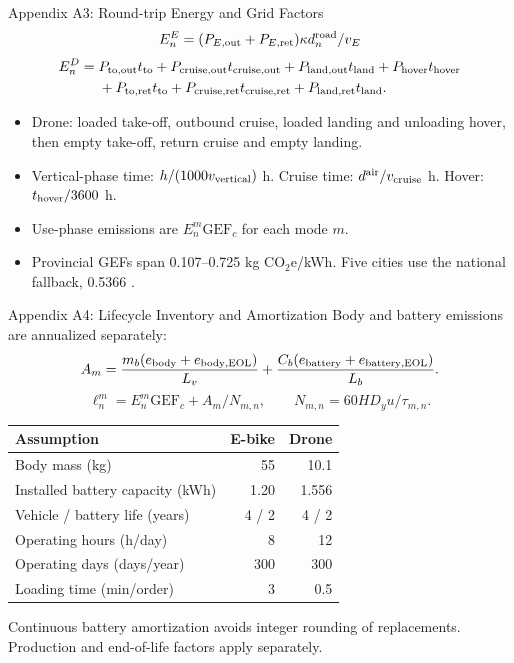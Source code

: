 \documentclass[9pt]{beamer}
\begin{document}
\begin{frame}{Appendix A3: Round-trip Energy and Grid Factors}
\label{app:emission:3}
\small
\[
E^E_n=(P_{E,\rm out}+P_{E,\rm ret})\kappa d_n^{\rm road}/v_E
\]
\[
\begin{aligned}
E^D_n={}&P_{\rm to,out}t_{\rm to}+P_{\rm cruise,out}t_{\rm cruise,out}
+P_{\rm land,out}t_{\rm land}+P_{\rm hover}t_{\rm hover}\\
&+P_{\rm to,ret}t_{\rm to}+P_{\rm cruise,ret}t_{\rm cruise,ret}
+P_{\rm land,ret}t_{\rm land}.
\end{aligned}
\]
\begin{itemize}
\item Drone: loaded take-off, outbound cruise, loaded landing and unloading hover, then empty take-off, return cruise and empty landing.
\item Vertical-phase time: $h/(1000v_{\rm vertical})$ h. Cruise time: $d^{\rm air}/v_{\rm cruise}$ h. Hover: $t_{\rm hover}/3600$ h.
\item Use-phase emissions are $E_n^m\mathrm{GEF}_c$ for each mode $m$.
\item Provincial GEFs span 0.107--0.725 kg CO$_2$e/kWh. Five cities use the national fallback, 0.5366 \parencite{mee_gef_2024}.
\end{itemize}

\end{frame}

\begin{frame}{Appendix A4: Lifecycle Inventory and Amortization}
\label{app:emission:4}
\small
Body and battery emissions are annualized separately:
\[
A_m=\frac{m_b(e_{\rm body}+e_{\rm body,EOL})}{L_v}
+\frac{C_b(e_{\rm battery}+e_{\rm battery,EOL})}{L_b}.
\]
\[
\ell_n^m=E_n^m\mathrm{GEF}_c+A_m/N_{m,n},\qquad N_{m,n}=60HD_yu/\tau_{m,n}.
\]
\centering
\begin{tabular}{lrr}
\toprule Assumption & E-bike & Drone\\\midrule
Body mass (kg) & 55 & 10.1\\
Installed battery capacity (kWh) & 1.20 & 1.556\\
Vehicle / battery life (years) & 4 / 2 & 4 / 2\\
Operating hours (h/day) & 8 & 12\\
Operating days (days/year) & 300 & 300\\
Loading time (min/order) & 3 & 0.5\\
\bottomrule
\end{tabular}
\par\raggedright\footnotesize Continuous battery amortization avoids integer rounding of replacements. Production and end-of-life factors apply separately.

\end{frame}
\end{document}
